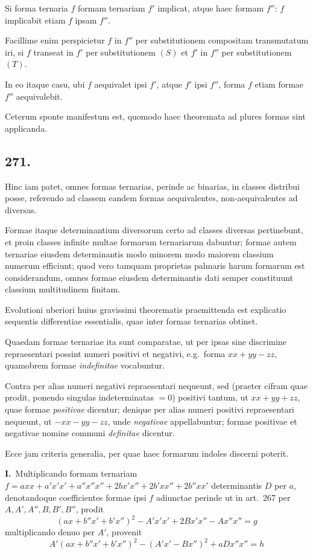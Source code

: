 \documentclass[12pt,a4paper]{article}
\theoremstyle{plain}
\theoremstyle{definition}
\theoremstyle{remark}
\begin{document}
Si forma ternaria $f$ formam ternariam $f'$ implicat, atque haec formam $f''$: $f$ implicabit etiam $f$ ipsam $f''$.

Facillime enim perspicietur $f$ in $f''$ per substitutionem compositam transmutatum iri, si $f$ transeat in $f'$ per substitutionem $(S)$ et $f'$ in $f''$ per substitutionem $(T)$.

In eo itaque casu, ubi $f$ aequivalet ipsi $f'$, atque $f'$ ipsi $f''$, forma $f$ etiam formae $f''$ aequivalebit.

Ceterum sponte manifestum est, quomodo haec theoremata ad plures formas sint applicanda.

\subsection*{271.}

Hinc iam patet, omnes formas ternarias, perinde ac binarias, in classes distribui posse, referendo ad classem eandem formas aequivalentes, non-aequivalentes ad diversas.

Formae itaque determinantium diversorum certo ad classes diversas pertinebunt, et proin classes infinite multae formarum ternariarum dabuntur; formae autem ternariae eiusdem determinantis modo minorem modo maiorem classium numerum efficiunt; quod vero tamquam proprietas palmaris harum formarum est considerandum, omnes formae eiusdem determinantis dati semper constituunt classium multitudinem finitam.

Evolutioni uberiori huius gravissimi theorematis praemittenda est explicatio sequentis differentiae essentialis, quae inter formas ternarias obtinet.

Quaedam formae ternariae ita sunt comparatae, ut per ipsas sine discrimine repraesentari possint numeri positivi et negativi, e.g.\ forma $xx+yy-zz$, quamobrem formae \emph{indefinitae} vocabuntur.

Contra per alias numeri negativi repraesentari nequeunt, sed (praeter cifram quae prodit, ponendo singulas indeterminatas $= 0$) positivi tantum, ut $xx+yy+zz$, quae formae \emph{positivae} dicentur; denique per alias numeri positivi repraesentari nequeunt, ut $-xx-yy-zz$, unde \emph{negativae} appellabuntur; formae positivae et negativae nomine communi \emph{definitae} dicentur.

Ecce jam criteria generalia, per quae haec formarum indoles discerni poterit.

\textbf{I.}\ Multiplicando formam ternariam $f = axx + a'x'x' + a''x''x'' + 2bx'x'' + 2b'xx'' + 2b''xx'$ determinantis $D$ per $a$, denotandoque coefficientes formae ipsi $f$ adiunctae perinde ut in art.\ 267 per $A, A', A'', B, B', B''$, prodit
\[(ax+b''x'+b'x'')^2 - A'x'x' + 2Bx'x'' - A x''x'' = g\]
multiplicando denuo per $A'$, provenit
\[A'(ax+b''x'+b'x'')^2 - (A'x'-Bx'')^2 + aDx''x'' = h\]
\end{document}
